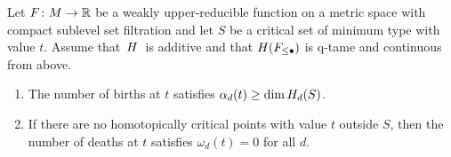 \begin{lem}
\label{lem:minimum_type_implies_some_birth_and_no_death}
	Let $F \colon M \to \mathbb{R}$ be a weakly upper-reducible function on a metric space with compact sublevel set filtration and let $S$ be a critical set of minimum type with value $t$.
	Assume that~$H$~is additive and that $H(F_{\leq \bullet})$ is q-tame and continuous from above.
	\begin{enumerate}
		\item The number of births at $t$ satisfies $\alpha_d(t) \geq \dim H_d(S)$.
		\item If there are no homotopically critical points with value $t$ outside $S$, then the number of deaths at $t$ satisfies $\omega_d(t) = 0$ for all $d$.
	\end{enumerate}
\end{lem}
